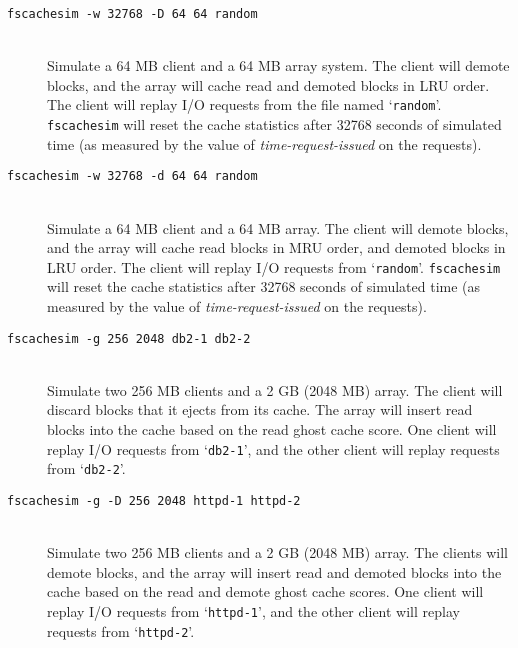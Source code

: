 \documentclass[twoside]{article}
\newcommand{\fscachesim}{\texttt{fscachesim}}
\begin{document}
\begin{description}

\item[\texttt{\fscachesim{} -w 32768 -D 64 64 random}] \quad\\ Simulate a
64 MB client and a 64 MB array system. The client will demote blocks, and
the array will cache read and demoted blocks in LRU order. The client will
replay I/O requests from the file named `\texttt{random}'. \fscachesim{}
will reset the cache statistics after 32768 seconds of simulated time (as
measured by the value of \textit{time-request-issued} on the requests).

\item[\texttt{\fscachesim{} -w 32768 -d 64 64 random}] \quad\\ Simulate a
64 MB client and a 64 MB array. The client will demote blocks, and the
array will cache read blocks in MRU order, and demoted blocks in LRU
order. The client will replay I/O requests from
`\texttt{random}'. \fscachesim{} will reset the cache statistics after
32768 seconds of simulated time (as measured by the value of
\textit{time-request-issued} on the requests).

\item[\texttt{\fscachesim{} -g 256 2048 db2-1 db2-2}] \quad\\ Simulate
two 256 MB clients and a 2 GB (2048 MB) array. The client will discard
blocks that it ejects from its cache. The array will insert read blocks
into the cache based on the read ghost cache score. One client will replay
I/O requests from `\texttt{db2-1}', and the other client will replay
requests from `\texttt{db2-2}'.

\item[\texttt{\fscachesim{} -g -D 256 2048 httpd-1 httpd-2}] \quad\\ Simulate
two 256 MB clients and a 2 GB (2048 MB) array. The clients will demote
blocks, and the array will insert read and demoted blocks into the cache
based on the read and demote ghost cache scores. One client will replay I/O
requests from `\texttt{httpd-1}', and the other client will replay requests
from `\texttt{httpd-2}'.

\end{description}



\end{document}
